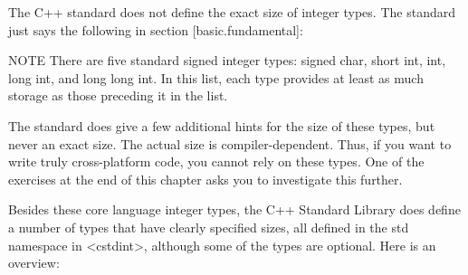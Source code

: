 The C++ standard does not define the exact size of integer types. The standard just says the following in section [basic.fundamental]:

\begin{myNotic}{NOTE}
There are five standard signed integer types: signed char, short int, int, long int, and long long int. In this list, each type provides at least as much storage as those preceding it in the list.
\end{myNotic}

The standard does give a few additional hints for the size of these types, but never an exact size. The actual size is compiler-dependent. Thus, if you want to write truly cross-platform code, you cannot rely on these types. One of the exercises at the end of this chapter asks you to investigate this further.

Besides these core language integer types, the C++ Standard Library does define a number of types that have clearly specified sizes, all defined in the std namespace in <cstdint>, although some of the types are optional. Here is an overview:

